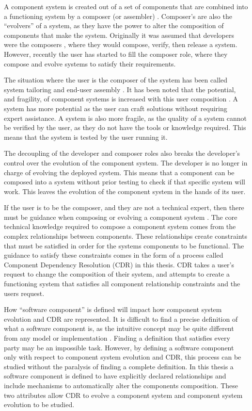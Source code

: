 A component system is created out of a set of components that are combined into a functioning system by a composer (or assembler) \citep{Szyperski2002}.
Composer's are also the ``evolvers'' of a system, as they have the power to alter the composition of components that make the system.
Originally it was assumed that developers were the composers \citep{Parnas1972,PrietoDiaz1987}, where they would compose, verify, then release a system.
However, recently the user has started to fill the composer role, where they compose and evolve systems to satisfy their requirements.

The situation where the user is the composer of the system has been called system tailoring \citep{Morch1997} and end-user assembly \citep{Szyperski2002}. 
It has been noted that the potential, and fragility, of component systems is increased with this user composition \citep{Szyperski2002}.
A system has more potential as the user can craft solutions without requiring expert assistance.
A system is also more fragile, as the quality of a system cannot be verified by the user, as they do not have the tools or knowledge required.
This means that the system is tested by the user running it. 

The decoupling of the developer and composer roles also breaks the developer's control over the evolution of the component system.
The developer is no longer in charge of evolving the deployed system.
This means that a component can be composed into a system without prior testing to check if that specific system will work.
This leaves the evolution of the component system in the hands of its user.

If the user is to be the composer, and they are not a technical expert, then there must be guidance when composing or evolving a component system \citep{Szyperski2002}.
The core technical knowledge required to compose a component system comes from the complex relationships between components.
These relationships create constraints that must be satisfied in order for the systems components to be functional.
The guidance to satisfy these constraints comes in the form of a process called Component Dependency Resolution (CDR) in this thesis.
CDR takes a user's request to change the composition of their system, and attempts to create a functioning system 
that satisfies all component relationship constraints and the users request.

How ``software component'' is defined will impact how component system evolution and CDR are represented.
It is difficult to find a precise definition of what a software component is, as the intuitive concept may be quite different from any model or implementation \citep{Crnkovic2011}.
Finding a definition that satisfies every party may be an impossible task.
However, by defining a software component only with respect to component system evolution and CDR, 
this process can be studied without the paralysis of finding a complete definition.
In this thesis a software component is defined to have explicitly declared relationships and include mechanisms to automatically alter the components composition.
These two attributes allow CDR to evolve a component system and component system evolution to be studied. 

